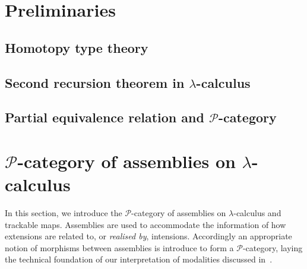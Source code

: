 \documentclass[a4paper,UKenglish,numberwithinsect,cleveref,thm-restate]{lipics-v2021}
\newcommand{\PP}{\mathscr{P}}
\theoremstyle{plain}
\begin{document}
\section{Preliminaries}\label{sec:preliminaries}

\subsection{Homotopy type theory}
\subsection{Second recursion theorem in \texorpdfstring{$\lambda$}{λ}-calculus}
\begin{theorem}
  
\end{theorem}
\begin{corollary}\label{coro:variant-of-SRT}
  
\end{corollary}
\subsection{Partial equivalence relation and \texorpdfstring{$\PP$}{P}-category}

\section{\texorpdfstring{$\PP$}{P}-category of assemblies on \texorpdfstring{$\lambda$}{λ}-calculus}\label{sec:assemblies}
In this section, we introduce the $\PP$-category of assemblies on $\lambda$-calculus and trackable maps.
Assemblies are used to accommodate the information of how extensions are related to, or \emph{realised by}, intensions. Accordingly an appropriate notion of morphisms between assemblies is introduce to form a $\PP$-category, laying
the technical foundation of our interpretation of modalities discussed in~.
\end{document}
